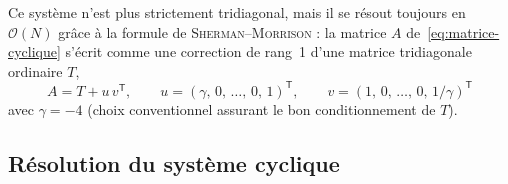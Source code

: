 \documentclass{tropLaClasse}
\begin{document}
Ce système n'est plus strictement tridiagonal, mais il se résout toujours en $\mathcal{O}(N)$ grâce à la formule de \textsc{Sherman--Morrison} : la matrice $A$ de~\eqref{eq:matrice-cyclique} s'écrit comme une correction de rang~1 d'une matrice tridiagonale ordinaire $T$,
\begin{equation}
    A = T + u\,v^{\mathsf{T}}, \qquad
    u = (\gamma,\, 0,\, \dots,\, 0,\, 1)^{\mathsf{T}}, \qquad
    v = (1,\, 0,\, \dots,\, 0,\, 1/\gamma)^{\mathsf{T}}
\end{equation}
avec $\gamma = -4$ (choix conventionnel assurant le bon conditionnement de $T$). 

\subsection{Résolution du système cyclique}
\end{document}

